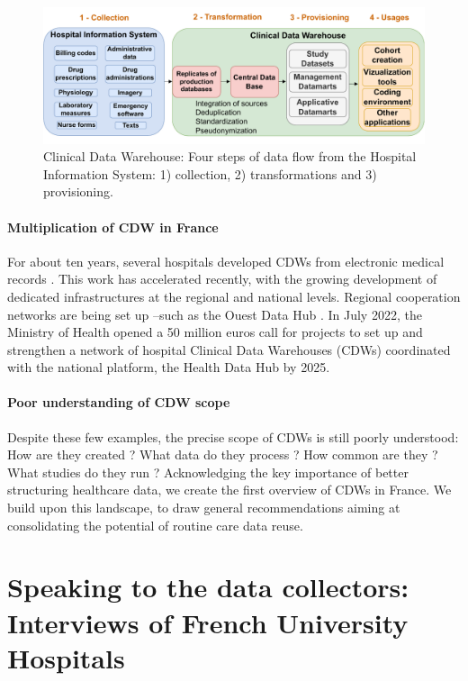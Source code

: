 \documentclass[french,12pt,twoside,a4paper]{book}
\begin{document}
\begin{figure}
  \centering
  \includegraphics[width=1\linewidth]{img/chapter_2/Fig1.pdf}
  \caption{Clinical Data Warehouse: Four steps of data flow from the Hospital Information System: 1) collection, 2) transformations and 3) provisioning.}
  \label{background:CDW:fig:ehr_flow}
\end{figure}


\paragraph{Multiplication of CDW in France} For about ten years, several
hospitals developed CDWs from electronic medical records
\citep{cuggia_roogle_2011,jannot_georges_2017,garcelon_finding_2017,wack_installation_2017,daniel_initializing_2018,malafaye_mise_2018,artemova_predimed_2019,lelong_building_2019,conan_les_2021,
  lamer_development_2022}. This work has accelerated recently, with the growing
development of dedicated infrastructures at the regional and national levels.
Regional cooperation networks are being set up --such as the Ouest Data Hub
\citep{hugo_2022}. In July 2022, the Ministry of Health opened a 50 million
euros call for projects to set up and strengthen a network of hospital Clinical
Data Warehouses (CDWs) coordinated with the national platform, the Health Data
Hub by 2025.

\paragraph{Poor understanding of CDW scope} Despite these few examples, the
precise scope of CDWs is still poorly understood: How are they created ? What
data do they process ? How common are they ? What studies do they run ?
Acknowledging the key importance of better structuring healthcare data, we
create the first overview of CDWs in France. We build upon this landscape, to
draw general recommendations aiming at consolidating the potential of routine
care data reuse.

\section{Speaking to the data collectors: Interviews of French University
  Hospitals}%
\label{sec:cdw:methods}%
\end{document}
